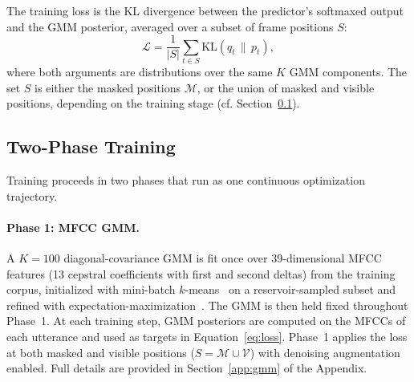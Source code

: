\documentclass[9pt,twocolumn]{article}
\theoremstyle{plain}
\theoremstyle{definition}
\theoremstyle{remark}
\begin{document}
The training loss is the KL divergence between the predictor's softmaxed output and the GMM posterior, averaged over a subset of frame positions $S$:
\begin{equation}
\mathcal{L} = \frac{1}{|S|} \sum_{t \in S} \mathrm{KL}\!\left(q_t \,\|\, p_t\right),
\label{eq:loss}
\end{equation}
where both arguments are distributions over the same $K$ GMM components. The set $S$ is either the masked positions $\mathcal{M}$, or the union of masked and visible positions, depending on the training stage (cf. Section~\ref{sec:two_phase}).

\subsection{Two-Phase Training}
\label{sec:two_phase}

Training proceeds in two phases that run as one continuous optimization trajectory.


\paragraph{Phase 1: MFCC GMM.} A $K{=}100$ diagonal-covariance GMM is fit once over 39-dimensional MFCC features (13 cepstral coefficients with first and second deltas) from the training corpus, initialized with mini-batch $k$-means~\citep{macqueen1967kmeans} on a reservoir-sampled subset and refined with expectation-maximization~\citep{dempster1977em}. The GMM is then held fixed throughout Phase~1. At each training step, GMM posteriors are computed on the MFCCs of each utterance and used as targets in Equation~\ref{eq:loss}. Phase~1 applies the loss at both masked and visible positions ($S = \mathcal{M} \cup \mathcal{V}$) with denoising augmentation enabled. Full details are provided in Section~\ref{app:gmm} of the Appendix.
\end{document}

